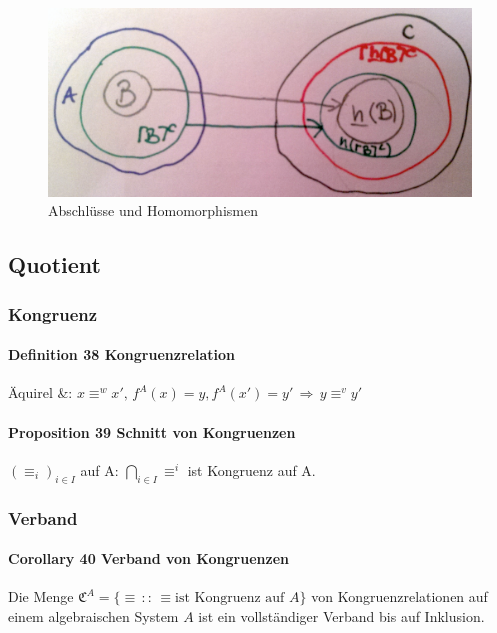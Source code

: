 \begin{figure}[h]
\noindent \centering{}\includegraphics[scale=0.08]{Abbildungen/37}\caption{Abschlüsse und Homomorphismen}
\end{figure}

\subsection{Quotient}

\subsubsection{Kongruenz}

\paragraph{Definition 38 Kongruenzrelation}
Äquirel \&: 
$
x\equiv^{w}x',\, f^{A}(x)=y, f^{A}(x')=y' \, \Rightarrow  \, y\equiv^{v}y'
$

\paragraph{Proposition 39 Schnitt von Kongruenzen}
$\left(\equiv_{i}\right)_{i\in I}$ auf A: $\bigcap_{i\in I}\equiv^{i}$ ist Kongruenz auf A.

\subsubsection{Verband}

\paragraph{Corollary 40 Verband von Kongruenzen}
Die Menge $\mathfrak{C}^{A}=\{\equiv\,::\,\equiv\textrm{ist Kongruenz auf }A\}$
von Kongruenzrelationen auf einem algebraischen System $A$ ist ein vollständiger Verband bis auf Inklusion.


